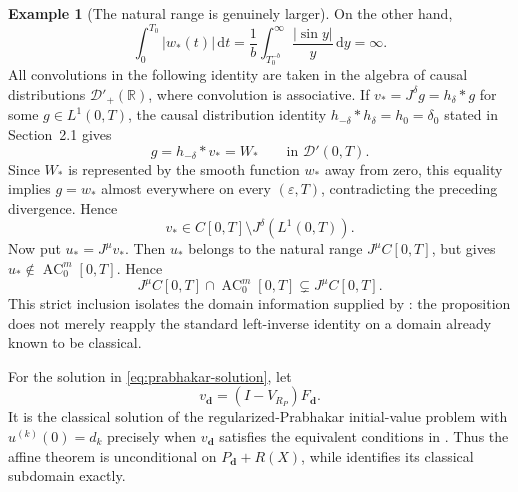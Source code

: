 \documentclass[11pt]{article}
\numberwithin{equation}{section}
\theoremstyle{definition}
\newtheorem{example}{Example}
\theoremstyle{remark}
\newcommand{\R}{\mathbb R}
\newcommand{\D}{\mathcal D}
\newcommand{\dd}{\,\mathrm d}
\newcommand{\AC}{\operatorname{AC}}
\begin{document}
\begin{example}[The natural range is genuinely larger]
On the other hand,
\begin{equation*}
\int_0^{T_0}|w_*(t)|\dd t
=\frac1b\int_{T_0^{-b}}^\infty\frac{|\sin y|}{y}\dd y
=\infty.
\end{equation*}
All convolutions in the following identity are taken in the algebra of causal
distributions $\D'_+(\R)$, where convolution is associative.
If $v_*=J^\delta g=h_\delta*g$ for some $g\in L^1(0,T)$, the causal
distribution identity $h_{-\delta}*h_\delta=h_0=\delta_0$ stated in
Section~2.1 gives
\begin{equation*}
g=h_{-\delta}*v_*=W_*
\qquad\text{in }\D'(0,T).
\end{equation*}
Since $W_*$ is represented by the smooth function $w_*$ away from zero,
this equality implies $g=w_*$ almost everywhere on every
$(\varepsilon,T)$, contradicting the preceding divergence.  Hence
\begin{equation*}
v_*\in C[0,T]\setminus J^\delta(L^1(0,T)).
\end{equation*}
Now put $u_*=J^\mu v_*$. Then $u_*$ belongs to the natural range
$J^\mu C[0,T]$, but  gives
$u_*\notin\AC_0^m[0,T]$. Hence
\begin{equation*}
J^\mu C[0,T]\cap\AC_0^m[0,T]
\subsetneq J^\mu C[0,T].
\end{equation*}
This strict inclusion isolates the domain information supplied by
: the proposition does not merely reapply the
standard left-inverse identity on a domain already known to be classical.
\end{example}

For the solution in \eqref{eq:prabhakar-solution}, let
\begin{equation*}
v_{\mathbf d}=(I-V_{R_P})F_{\mathbf d}.
\end{equation*}
It is the classical solution of the regularized-Prabhakar initial-value problem with $u^{(k)}(0)=d_k$ precisely when $v_{\mathbf d}$ satisfies the equivalent conditions in . Thus the affine theorem is unconditional on $P_{\mathbf d}+R(X)$, while  identifies its classical subdomain exactly.
\end{document}

